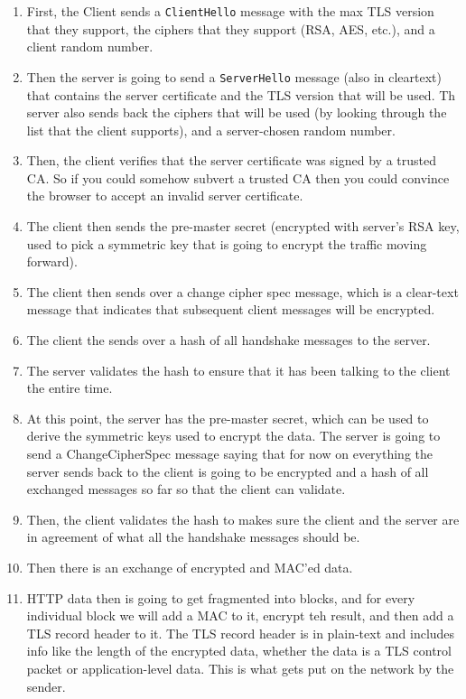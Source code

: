 \documentclass[12pt]{article}
\theoremstyle{definition}
\begin{document}
\begin{itemize}
    \begin{enumerate}
        \item First, the Client sends a \texttt{ClientHello} message with the max TLS version that they support, the ciphers that they support (RSA, AES, etc.), and a client random number.
        \item Then the server is going to send a \texttt{ServerHello} message (also in cleartext) that contains the server certificate and the TLS version that will be used. Th server also sends back the ciphers that will be used (by looking through the list that the client supports), and a server-chosen random number.
        \item Then, the client verifies that the server certificate was signed by a trusted CA. So if you could somehow subvert a trusted CA then you could convince the browser to accept an invalid server certificate.
        \item The client then sends the pre-master secret (encrypted with server's RSA key, used to pick a symmetric key that is going to encrypt the traffic moving forward).
        \item The client then sends over a change cipher spec message, which is a clear-text message that indicates that subsequent client messages will be encrypted.
        \item The client the sends over a hash of all handshake messages to the server.
        \item The server validates the hash to ensure that it has been talking to the client the entire time.
        \item At this point, the server has the pre-master secret, which can be used to derive the symmetric keys used to encrypt the data. The server is going to send a ChangeCipherSpec message saying that for now on everything the server sends back to the client is going to be encrypted and a hash of all exchanged messages so far so that the client can validate.
        \item Then, the client validates the hash to makes sure the client and the server are in agreement of what all the handshake messages should be.
        \item Then there is an exchange of encrypted and MAC'ed data.
        \item HTTP data then is going to get fragmented into blocks, and for every individual block we will add a MAC to it, encrypt teh result, and then add a TLS record header to it. The TLS record header is in plain-text and includes info like the length of the encrypted data, whether the data is a TLS control packet or application-level data. This is what gets put on the network by the sender.

\end{enumerate}
\end{itemize}
\end{document}
